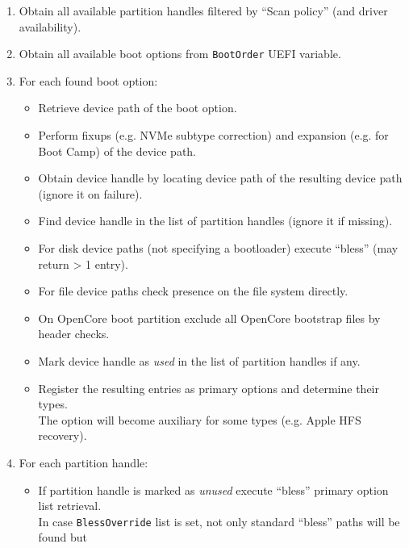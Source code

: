 \documentclass[]{article}
\providecommand{\tightlist}{%
  \setlength{\itemsep}{0pt}\setlength{\parskip}{0pt}}
\begin{document}
\begin{enumerate}
\tightlist
\item Obtain all available partition handles filtered by ``Scan policy'' (and driver availability).
\item Obtain all available boot options from \texttt{BootOrder} UEFI variable.
\item For each found boot option:
  \begin{itemize}
  \item Retrieve device path of the boot option.
  \item Perform fixups (e.g. NVMe subtype correction) and expansion (e.g. for Boot Camp) of the device path.
  \item Obtain device handle by locating device path of the resulting device path (ignore it on failure).
  \item Find device handle in the list of partition handles (ignore it if missing).
  \item For disk device paths (not specifying a bootloader) execute ``bless'' (may return > 1 entry).
  \item For file device paths check presence on the file system directly.
  \item On OpenCore boot partition exclude all OpenCore bootstrap files by header checks.
  \item Mark device handle as \textit{used} in the list of partition handles if any.
  \item Register the resulting entries as primary options and determine their types. \\
  The option will become auxiliary for some types (e.g. Apple HFS recovery).
  \end{itemize}
\item For each partition handle:
  \begin{itemize}
  \item If partition handle is marked as \textit{unused} execute ``bless'' primary option list retrieval. \\
    In case \texttt{BlessOverride} list is set, not only standard ``bless'' paths will be found but

\end{itemize}
\end{enumerate}
\end{document}
